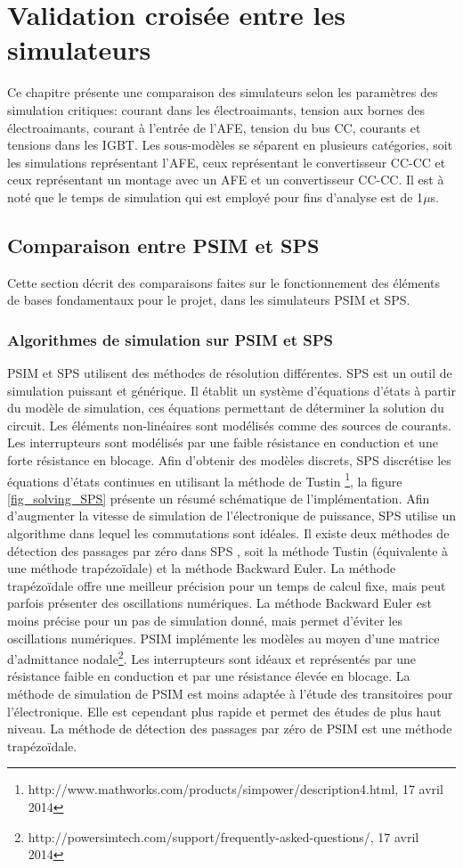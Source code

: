 \chapter{Validation croisée entre les simulateurs}
Ce chapitre présente une comparaison des simulateurs selon les paramètres des simulation critiques: courant dans les électroaimants, tension aux bornes des électroaimants, courant à l'entrée de l'AFE, tension du bus CC, courants et tensions dans les IGBT. Les sous-modèles se séparent en plusieurs catégories, soit les simulations représentant l'AFE, ceux représentant le convertisseur CC-CC et ceux représentant un montage avec un AFE et un convertisseur CC-CC. Il est à noté que le temps de simulation qui est employé pour fins d'analyse est de 1$\mu$s. 

\section{Comparaison entre PSIM et SPS}
Cette section décrit des comparaisons faites sur le fonctionnement des éléments de bases fondamentaux pour le projet, dans les simulateurs PSIM et SPS.
\subsection{Algorithmes de simulation sur PSIM et SPS}
PSIM et SPS utilisent des méthodes de résolution différentes. SPS est un outil de simulation puissant et générique. Il établit un système d'équations d'états à partir du modèle de simulation, ces équations permettant de déterminer la solution du circuit. Les éléments non-linéaires sont modélisés comme des sources de courants. Les interrupteurs sont modélisés par une faible résistance en conduction et une forte résistance en blocage. Afin d'obtenir des modèles discrets, SPS discrétise les équations d'états continues en utilisant la méthode de Tustin  \footnote{http://www.mathworks.com/products/simpower/description4.html, 17 avril 2014}, la figure \ref{fig_solving_SPS} présente un résumé schématique de l'implémentation. Afin d'augmenter la vitesse de simulation de l'électronique de puissance, SPS utilise un algorithme dans lequel les commutations sont idéales. Il existe deux méthodes de détection des passages par zéro dans SPS , soit la méthode Tustin  (équivalente à une méthode trapézoïdale) et la méthode Backward Euler. La méthode trapézoïdale offre une meilleur précision pour un temps de calcul fixe, mais peut parfois présenter des oscillations numériques. La méthode Backward Euler est moins précise pour un pas de simulation donné, mais permet d'éviter les oscillations numériques. PSIM implémente les modèles au moyen d'une matrice d'admittance nodale\footnote{http://powersimtech.com/support/frequently-asked-questions/, 17 avril 2014}. Les interrupteurs sont idéaux et représentés par une résistance faible en conduction et par une résistance élevée en blocage. La méthode de simulation de PSIM est moins adaptée à l'étude des transitoires pour l'électronique. Elle est cependant plus rapide et permet des études de plus haut niveau. La méthode de détection des passages par zéro de PSIM est une méthode trapézoïdale. 

